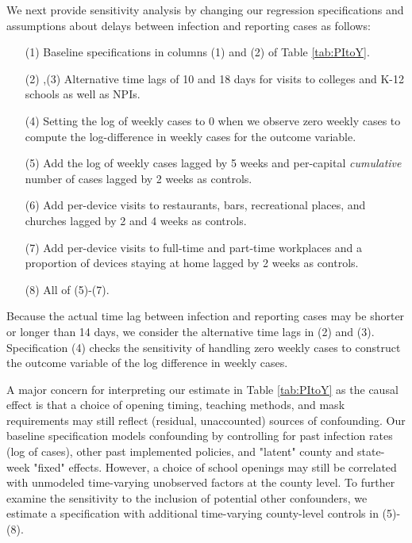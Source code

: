 \documentclass[9pt,twocolumn,twoside,lineno]{pnas-new}
\begin{document}
We next provide sensitivity analysis by changing our regression specifications and assumptions about delays between infection and reporting cases as follows:
\begin{itemize}
\item[(1)] Baseline specifications in columns (1) and (2) of Table \ref{tab:PItoY}.
\item[(2)]\hspace{-0.15cm},(3) Alternative time lags of 10 and 18 days for visits to colleges and K-12 schools as well as NPIs.
\item[(4)] Setting the log of weekly cases to $0$ when we observe zero weekly cases to compute the log-difference in weekly cases for the outcome variable.
\item[(5)] Add the log of weekly cases lagged by 5 weeks and per-capital \textit{cumulative} number of cases lagged by 2 weeks as controls.
\item[(6)] Add per-device visits to restaurants, bars, recreational places, and churches  lagged by 2 and 4 weeks as controls.
\item[(7)] Add per-device visits to full-time and part-time workplaces and a proportion of devices staying at home lagged by 2 weeks as controls.
\item[(8)] All of (5)-(7).
\end{itemize}

Because the actual time lag between infection and reporting cases may be shorter or longer than 14 days, we consider the alternative time lags in (2) and (3). Specification (4) checks the sensitivity of handling zero weekly cases to construct the outcome variable of the log difference in weekly cases.

A major concern for interpreting our estimate in Table \ref{tab:PItoY} as the causal effect is that a choice of opening timing, teaching methods, and mask requirements may still reflect (residual, unaccounted) sources of confounding. Our baseline specification models confounding by controlling for past infection rates (log of cases), other past implemented policies, and "latent" county and state-week "fixed" effects. However, a choice of school openings may still be correlated with unmodeled time-varying unobserved factors at the county level. To further examine the sensitivity to the inclusion of potential other confounders, we estimate a specification with additional time-varying county-level controls in (5)-(8).
\end{document}
